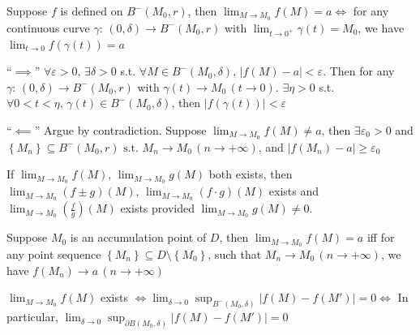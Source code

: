 \begin{theorem}
    Suppose $f$ is defined on $B^-\left(M_0,r\right)$, then $\lim_{M\to M_0}f(M)=a\iff$ for any continuous curve $\gamma:\,(0,\delta)\to B^-\left(M_0,r\right)$ with $\lim_{t\to 0^+}\gamma(t)=M_0$, we have $\lim_{t\to 0}f\left(\gamma(t)\right)=a$
    \begin{pf}
        ``$\implies$'' $\forall \varepsilon>0,\,\exists\delta>0$ s.t. $\forall M\in B^-\left(M_0,\delta\right),\,\left|f(M)-a\right|<\varepsilon$. Then for any $\gamma:\,(0,\delta)\to B^-\left(M_0,r\right)$ with $\gamma(t)\to M_0\,(t\to 0)$. $\exists\eta>0$ s.t. $\forall 0<t<\eta,\,\gamma(t)\in B^-(M_0,\delta)$, then $\left|f\left(\gamma(t)\right)\right|<\varepsilon$

        ``$\impliedby$'' Argue by contradiction. Suppose $\lim_{M\to M_0}f(M)\neq a$, then $\exists\varepsilon_0>0$ and $\left\{M_n\right\}\subseteq B^-\left(M_0,r\right)\text{ s.t. }M_n\to M_0\,(n\to+\infty)$, and $\left|f\left(M_n\right)-a\right|\geq\varepsilon_0$

    \end{pf}
\end{theorem}

\begin{proposition}
    If $\lim_{M\to M_0}f(M),\,\lim_{M\to M_0}g(M)$ both exists, then $\lim_{M\to M_0}(f\pm g)(M),\,\lim_{M\to M_0}(f\cdot g)(M)$ exists and $\lim_{M\to M_0}(\frac{f}{g})(M)$ exists provided $\lim_{M\to M_0}g(M)\neq0$.
\end{proposition}

\begin{proposition}
    Suppose $M_0$ is an accumulation point of $D$, then $\lim_{M\to M_0}f(M)=a$ iff for any point sequence $\left\{M_n\right\}\subseteq D\setminus\left\{M_0\right\}$, such that $M_n\to M_0\,(n\to+\infty)$, we have $f\left(M_n\right)\to a\,(n\to+\infty)$
\end{proposition}

$\lim_{M\to M_0}f(M)$ exists $\iff\lim_{\delta\to 0}\sup_{B^-\left(M_0,\delta\right)}\left|f(M)-f\left(M'\right)\right|=0\iff$ In particular, $\lim_{\delta\to 0}\sup_{\partial B\left(M_0,\delta\right)}\left|f(M)-f\left(M'\right)\right|=0$

